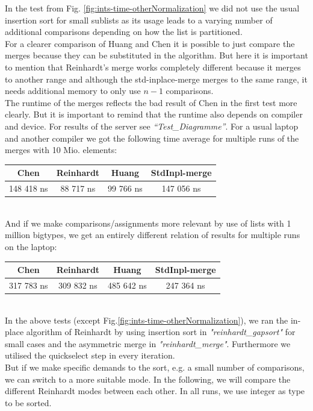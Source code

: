 \documentclass[11pt,pdftex,a4paper, twocolumn]{article}
\begin{document}
In the test from Fig. \ref{fig:ints-time-otherNormalization} we did not use the usual insertion sort for small sublists as its usage leads to a varying number of additional comparisons depending on how the list is partitioned. \\
For a clearer comparison of Huang and Chen it is possible to just compare the merges because they can be substituted in the algorithm. But here it is important to mention that Reinhardt’s merge works completely different because it merges to another range and although the std-inplace-merge merges to the same range, it needs additional memory to only use $ n-1 $ comparisons. \\
The runtime of the merges reflects the bad result of Chen in the first test more clearly. But it is important to remind that the runtime also depends on compiler and device. For results of the server see \textit{“Test\_Diagramme”}. For a usual laptop and another compiler we got the following time average for multiple runs of the merges with 10 Mio. elements: \\
\scriptsize
\begin{tabular}{|c|c|c|c|} \hline
Chen & Reinhardt & Huang & StdInpl-merge \\ \hline
148 418 ns & 88 717 ns & 99 766 ns & 147 056 ns \\ \hline
\end{tabular}
\normalsize \\
And if we make comparisons/assignments more relevant by use of lists with 1 million bigtypes, we get an entirely different relation of results for multiple runs on the laptop: \\
\scriptsize
\begin{tabular}{|c|c|c|c|} \hline
Chen & Reinhardt & Huang & StdInpl-merge \\ \hline
317 783 ns & 309 832 ns & 485 642 ns & 247 364 ns \\ \hline
\end{tabular}
\normalsize \\
In the above tests (except Fig.\ref{fig:ints-time-otherNormalization}), we ran the in-place algorithm of Reinhardt by using insertion sort in \textit{"reinhardt\_gapsort"} for small cases and the asymmetric merge in \textit{"reinhardt\_merge"}. Furthermore we utilised the quickselect step in every iteration. \\
But if we make specific demands to the sort, e.g. a small number of comparisons, we can switch to a more suitable mode. In the following, we will compare the different Reinhardt modes between each other. In all runs, we use integer as type to be sorted. \\
\end{document}
